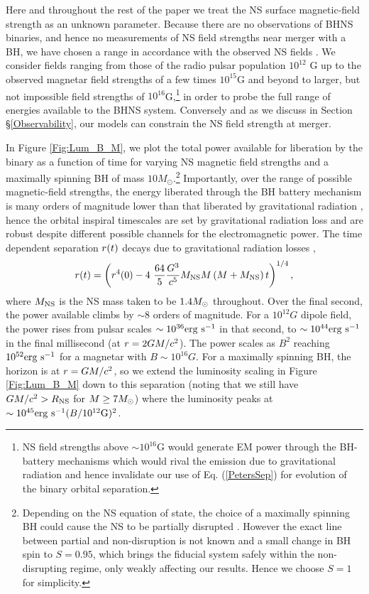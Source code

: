 Here and throughout the rest of the paper we treat the NS surface magnetic-field strength as an unknown parameter. Because there are no observations of BHNS binaries, and hence no measurements of NS field strengths near merger with a BH, we have chosen a range in accordance with the observed NS fields \citep[see \textit{e.g.}][]{Kaspi:2016}. We consider fields ranging from those of the radio pulsar population $10^{12}$ G up to the observed magnetar field strengths of a few times $10^{15}$G \citep{Magnetars:2014} and beyond to larger, but not impossible field strengths of $10^{16}$G,\footnote{NS field strengths above $\sim10^{16}$G would generate EM power through the BH-battery mechanisms which would rival the emission due to gravitational radiation and hence invalidate our use of Eq. (\ref{PetersSep}) for evolution of the  binary orbital separation.} in order to probe the full range of energies available to the BHNS system. 
Conversely and as we discuss in Section \S \ref{Observability}, our models can constrain the NS field strength at merger.


In Figure \ref{Fig:Lum_B_M}, we plot the total power available for
liberation by the binary as a function of time for varying NS magnetic
field strengths and a maximally spinning BH of mass $10M_\odot$.\footnote{Depending on the NS equation of state, the choice of a maximally spinning BH could cause the NS to be partially disrupted \citep[\textit{e.g.}][]{Foucart:2012}. However the exact line between partial and non-disruption is not known and a small change in BH spin to $S=0.95$, which brings the fiducial system safely within the non-disrupting regime, only weakly affecting our results. Hence we choose $S=1$ for simplicity.}
Importantly, over the range of possible magnetic-field strengths, 
the energy liberated through the BH battery mechanism is
many orders of magnitude lower than that liberated by gravitational
radiation \citep{McL:2011}, hence the orbital inspiral timescales are
set by gravitational radiation loss and are robust despite different
possible channels for the electromagnetic power.  The time dependent
separation $r(t)$ decays due to gravitational radiation losses
\cite{Peters64},
\begin{align}
\label{PetersSep}
r(t) = \left( r^4(0) - 4 \ \frac{64}{5} \frac{G^3}{c^5} M_{\rm NS} M \left(M + M_{\rm NS}\right) t \right)^{1/4},
\end{align}
where $M_{\rm NS}$ is the NS mass taken to be $1.4 {M_{\odot}}$ throughout.
Over the final second, the power available climbs by $\sim8$ orders of
magnitude. For a $10^{12}G$ dipole field, the power rises from pulsar
scales $\sim 10^{36} {\rm erg \ s}^{-1}$ in that second, to
$\sim10^{44} {\rm erg \ s}^{-1}$ in the final millisecond (at $r=2
G M/c^2$).  The power scales as $B^2$ reaching $10^{52} {\rm erg
  \ s}^{-1}$ for a magnetar with $B\sim10^{16}G$. For a maximally
spinning BH, the horizon is at $r=G M/c^2$, so we extend the
luminosity scaling in Figure \ref{Fig:Lum_B_M} down to this separation
(noting that we still have $GM/c^2 > R_{\rm{NS}}$ for $M \geq 7
{M_{\odot}}$) where the luminosity peaks at $\sim 10^{45} {\rm erg \ s}^{-1}
(B/10^{12} \rm{G})^2$.
  


